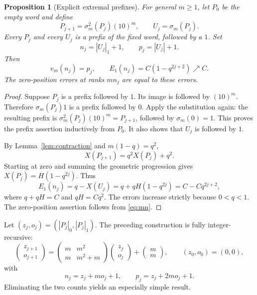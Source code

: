 \documentclass[11pt]{article}
\numberwithin{equation}{section}
\newtheorem{proposition}[theorem]{Proposition}
\theoremstyle{definition}
\theoremstyle{remark}
\begin{document}
\begin{proposition}[Explicit extremal prefixes]\label{prop:extremal}
For general $m\ge1$, let $P_0$ be the empty word and define
\begin{equation}\label{eq:extremal-prefix}
P_{j+1}=\sigma_m^2(P_j)(10)^m,\qquad U_j=\sigma_m(P_j).
\end{equation}
Every $P_j$ and every $U_j$ is a prefix of the fixed word, followed by a
$1$. Set
\begin{equation}\label{eq:extremal-np}
n_j=|U_j|_1+1,\qquad p_j=|U_j|+1.
\end{equation}
Then
\begin{equation}\label{eq:extremal-errors}
v_m(n_j)=p_j,\qquad
E_1(n_j)=C(1-q^{2j+2})\nearrow C.
\end{equation}
The zero-position errors at ranks $mn_j$ are equal to these errors.
\end{proposition}
\begin{proof}
Suppose $P_j$ is a prefix followed by $1$. Its image is followed by
$(10)^m$. Therefore $\sigma_m(P_j)1$ is a prefix followed by $0$.
Apply the substitution again: the resulting prefix is
$\sigma_m^2(P_j)(10)^m=P_{j+1}$, followed by $\sigma_m(0)=1$.
This proves the prefix assertion inductively from $P_0$. It also shows
that $U_j$ is followed by $1$.

By Lemma~\ref{lem:contraction} and $m(1-q)=q^2$,
\[
X(P_{j+1})=q^2X(P_j)+q^2.
\]
Starting at zero and summing the geometric progression gives
$X(P_j)=H(1-q^{2j})$. Thus
\[
E_1(n_j)=q-X(U_j)=q+qH(1-q^{2j})
=C-Cq^{2j+2},
\]
where $q+qH=C$ and $qH=Cq^2$. The errors increase strictly because
$0<q<1$. The zero-position assertion follows from \eqref{eq:mn}.
\end{proof}

Let $(z_j,o_j)=(|P_j|_0,|P_j|_1)$. The preceding construction is fully
integer-recursive:
\begin{equation}\label{eq:counts-extremal}
\begin{pmatrix}z_{j+1}\\o_{j+1}\end{pmatrix}
=\begin{pmatrix}m&m^2\\m&m^2+m\end{pmatrix}
\begin{pmatrix}z_j\\o_j\end{pmatrix}
+\begin{pmatrix}m\\m\end{pmatrix},\qquad (z_0,o_0)=(0,0),
\end{equation}
with
\begin{equation}\label{eq:np-fromcounts}
n_j=z_j+mo_j+1,\qquad p_j=z_j+2mo_j+1.
\end{equation}
Eliminating the two counts yields an especially simple result.
\end{document}
